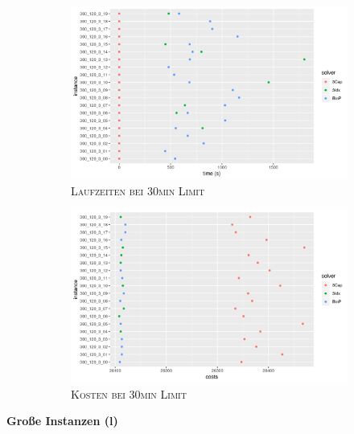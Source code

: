\begin{figure}[H]
\centering
\begin{subfigure}[b]{0.4\textwidth}
\centering
\includegraphics[width=1.3\textwidth]{img/solver_instance_time_b=3_m_1800s.png}
\caption{\textsc{Laufzeiten bei 30min Limit}}
\label{fig:b=3_m_runtimes}
\end{subfigure}
\hfill
\begin{subfigure}[b]{0.4\textwidth}
\centering
\includegraphics[width=1.3\textwidth]{img/solver_instance_cost_b=3_m_1800s.png}
\caption{\textsc{Kosten bei 30min Limit}}
\label{fig:b=3_m_costs}
\end{subfigure}
\caption{}
\end{figure}

\pagebreak

\textbf{Große Instanzen (l)}

